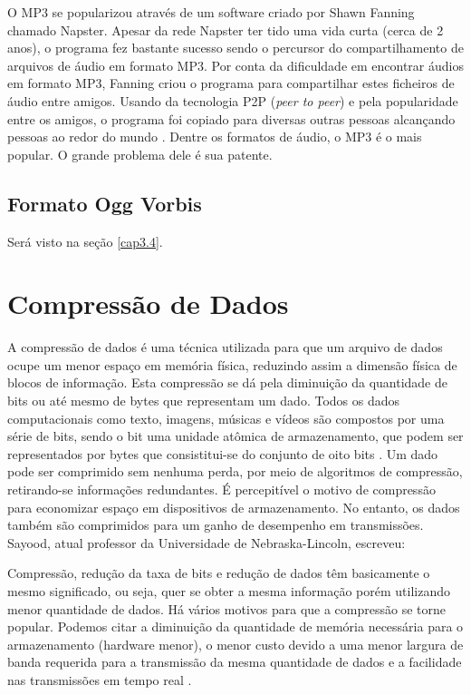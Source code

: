 O MP3 se popularizou através de um software criado por Shawn Fanning chamado Napster. Apesar da rede Napster ter tido uma vida curta (cerca de 2 anos), o programa fez bastante sucesso sendo o percursor do compartilhamento de arquivos de áudio em formato MP3. Por conta da dificuldade em encontrar áudios em formato MP3, Fanning criou o programa para compartilhar estes ficheiros de áudio entre amigos. Usando da tecnologia P2P (\textit{peer to peer}) e pela popularidade entre os amigos, o programa foi copiado para diversas outras pessoas alcançando pessoas ao redor do mundo \cite{mp3oquee}. Dentre os formatos de áudio, o MP3 é o mais popular. O grande problema dele é sua patente.


\subsection{Formato Ogg Vorbis}

Será visto na seção \ref{cap3.4}.

\section{Compressão de Dados}

A compressão de dados é uma técnica utilizada para que um arquivo de dados ocupe um menor espaço em memória física, reduzindo assim a dimensão física de blocos de informação. Esta compressão se dá pela diminuição da quantidade de bits ou até mesmo de bytes que representam um dado. Todos os dados computacionais como texto, imagens, músicas e vídeos são compostos por uma série de bits, sendo o bit uma unidade atômica de armazenamento, que podem ser representados por bytes que consistitui-se do conjunto de oito bits \cite{tenenbaumdados}. Um dado pode ser comprimido sem nenhuma perda, por meio de algoritmos de compressão, retirando-se informações redundantes. É percepitível o motivo de compressão para economizar espaço em dispositivos de armazenamento. No entanto, os dados também são comprimidos para um ganho de desempenho em transmissões. Sayood, atual professor da Universidade de Nebraska-Lincoln, escreveu:

\begin{citacao}
Compressão, redução da taxa de bits e redução de dados têm basicamente o mesmo significado, ou seja, quer se obter a mesma informação porém utilizando menor quantidade de dados. Há vários motivos para que a compressão se torne popular. Podemos citar a diminuição da quantidade de memória necessária para o armazenamento (hardware menor), o menor custo devido a uma menor largura de banda requerida para a transmissão da mesma quantidade de dados e a facilidade nas transmissões em tempo real \cite{sayood}.
\end{citacao}

